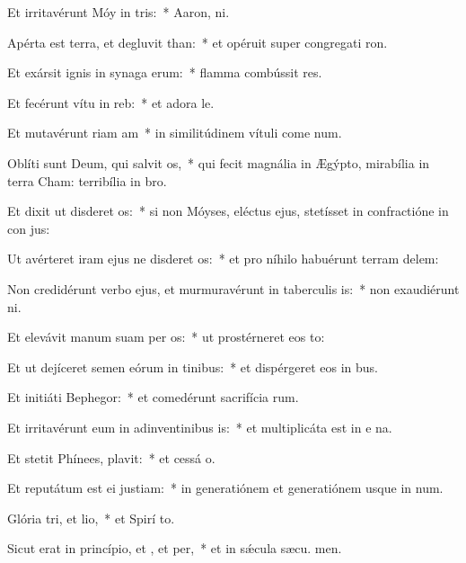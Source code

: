 \item Et irritavérunt Móy in tris:~* Aaron,  ni.
\item Apérta est terra, et degluvit than:~* et opéruit super congregati ron.
\item Et exársit ignis in synaga erum:~* flamma combússit res.
\item Et fecérunt vítu in reb:~* et adora le.
\item Et mutavérunt riam am~* in similitúdinem vítuli come num.
\item Oblíti sunt Deum, qui salvit os,~* qui fecit magnália in Ægýpto, mirabília in terra Cham: terribília in  bro.
\item Et dixit ut disderet os:~* si non Móyses, eléctus ejus, stetísset in confractióne in con jus:
\item Ut avérteret iram ejus ne disderet os:~* et pro níhilo habuérunt terram delem:
\item Non credidérunt verbo ejus, et murmuravérunt in taberculis is:~* non exaudiérunt  ni.
\item Et elevávit manum suam per os:~* ut prostérneret eos  to:
\item Et ut dejíceret semen eórum in tinibus:~* et dispérgeret eos in bus.
\item Et initiáti  Bephegor:~* et comedérunt sacrifícia rum.
\item Et irritavérunt eum in adinventinibus is:~* et multiplicáta est in e na.
\item Et stetit Phínees,  plavit:~* et cessá o.
\item Et reputátum est ei  justiam:~* in generatiónem et generatiónem usque in num.
\item Glória tri, et lio,~* et Spirí to.
\item Sicut erat in princípio, et , et per,~* et in sǽcula sæcu. men.
